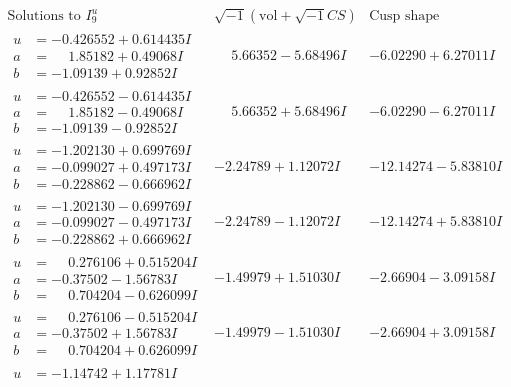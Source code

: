 \documentclass[1p]{elsarticle_modified}
\theoremstyle{definition}
\newcommand{\I}{\sqrt{-1}}
\begin{document}
$$\begin{array}{c|c|c}  
\text{Solutions to }I^u_{9}& \I (\text{vol} + \sqrt{-1}CS) & \text{Cusp shape}\\
 \hline 
\begin{aligned}
u &= -0.426552 + 0.614435 I \\
a &= \phantom{-}1.85182 + 0.49068 I \\
b &= -1.09139 + 0.92852 I\end{aligned}
 & \phantom{-}5.66352 - 5.68496 I & -6.02290 + 6.27011 I \\ \hline\begin{aligned}
u &= -0.426552 - 0.614435 I \\
a &= \phantom{-}1.85182 - 0.49068 I \\
b &= -1.09139 - 0.92852 I\end{aligned}
 & \phantom{-}5.66352 + 5.68496 I & -6.02290 - 6.27011 I \\ \hline\begin{aligned}
u &= -1.202130 + 0.699769 I \\
a &= -0.099027 + 0.497173 I \\
b &= -0.228862 - 0.666962 I\end{aligned}
 & -2.24789 + 1.12072 I & -12.14274 - 5.83810 I \\ \hline\begin{aligned}
u &= -1.202130 - 0.699769 I \\
a &= -0.099027 - 0.497173 I \\
b &= -0.228862 + 0.666962 I\end{aligned}
 & -2.24789 - 1.12072 I & -12.14274 + 5.83810 I \\ \hline\begin{aligned}
u &= \phantom{-}0.276106 + 0.515204 I \\
a &= -0.37502 - 1.56783 I \\
b &= \phantom{-}0.704204 - 0.626099 I\end{aligned}
 & -1.49979 + 1.51030 I & -2.66904 - 3.09158 I \\ \hline\begin{aligned}
u &= \phantom{-}0.276106 - 0.515204 I \\
a &= -0.37502 + 1.56783 I \\
b &= \phantom{-}0.704204 + 0.626099 I\end{aligned}
 & -1.49979 - 1.51030 I & -2.66904 + 3.09158 I \\ \hline\begin{aligned}
u &= -1.14742 + 1.17781 I \\

\end{aligned}
\end{array}$$
\end{document}
